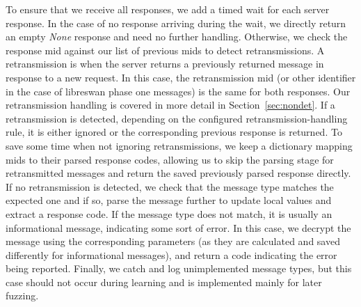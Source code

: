 To ensure that we receive all responses, we add a timed wait for each server response. In the case of no response arriving during the wait, we directly return an empty \textit{None} response and need no further handling. Otherwise, we check the response \ac{mid} against our list of previous \acp{mid} to detect retransmissions. A retransmission is when the server returns a previously returned message in response to a new request. In this case, the retransmission \ac{mid} (or other identifier in the case of libreswan phase one messages) is the same for both responses. Our retransmission handling is covered in more detail in Section~\ref{sec:nondet}. If a retransmission is detected, depending on the configured retransmission-handling rule, it is either ignored or the corresponding previous response is returned. To save some time when not ignoring retransmissions, we keep a dictionary mapping \acp{mid} to their parsed response codes, allowing us to skip the parsing stage for retransmitted messages and return the saved previously parsed response directly. If no retransmission is detected, we check that the message type matches the expected one and if so, parse the message further to update local values and extract a response code. If the message type does not match, it is usually an informational message, indicating some sort of error. In this case, we decrypt the message using the corresponding parameters (as they are calculated and saved differently for informational messages), and return a code indicating the error being reported. Finally, we catch and log unimplemented message types, but this case should not occur during learning and is implemented mainly for later fuzzing.

